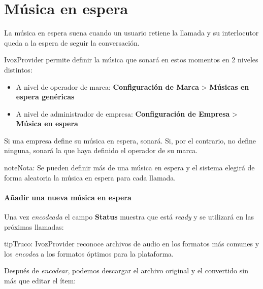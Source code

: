 \documentclass[letterpaper,10pt,spanish]{sphinxmanual}
\begin{document}
\section{Música en espera}
\label{pbx_features/music_on_hold::doc}\label{pbx_features/music_on_hold:musica-en-espera}\label{pbx_features/music_on_hold:musiconhold}
La música en espera suena cuando un usuario retiene la llamada y su interlocutor queda a la espera de seguir la conversación.

IvozProvider permite definir la música que sonará en estos momentos en 2 niveles distintos:
\begin{itemize}
\item {} 
A nivel de operador de marca: \textbf{Configuración de Marca} \textgreater{} \textbf{Músicas en espera genéricas}

\item {} 
A nivel de administrador de empresa: \textbf{Configuración de Empresa} \textgreater{} \textbf{Música en espera}

\end{itemize}

Si una empresa define su música en espera, sonará. Si, por el contrario, no define ninguna, sonará la que haya definido el operador de su marca.

\begin{notice}{note}{Nota:}
Se pueden definir más de una música en espera y el sistema elegirá de forma aleatoria la música en espera para cada llamada.
\end{notice}
\paragraph{Añadir una nueva música en espera}

\noindent{}

Una vez \emph{encodeada} el campo \textbf{Status} muestra que está \emph{ready} y se utilizará en las próximas llamadas:

\noindent{}

\begin{notice}{tip}{Truco:}
IvozProvider reconoce archivos de audio en los formatos más comunes y los \emph{encodea} a los formatos óptimos para la plataforma.
\end{notice}

Después de \emph{encodear}, podemos descargar el archivo original y el convertido sin más que editar el ítem:
\end{document}
